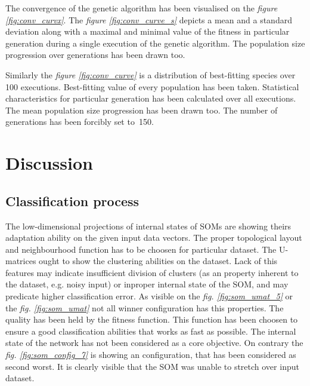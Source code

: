 \documentclass[a4paper]{IEEEtran}
\begin{document}
The convergence of the genetic algorithm has been visualised
on the \textit{figure \ref{fig:conv_curvx}}.
The \textit{figure \ref{fig:conv_curve_s}} depicts a mean and a standard deviation 
along with a maximal and minimal value of the fitness
in particular generation during a single execution of the genetic algorithm.
The population size progression over generations has been drawn too.

Similarly the \textit{figure \ref{fig:conv_curve}} is a distribution of best-fitting species over 100 executions.
Best-fitting value of every population has been taken. Statistical characteristics for particular generation
has been calculated over all executions.
The mean population size progression has been drawn too. The number of generations has been forcibly set to~150.


\section{Discussion}
\subsection{Classification process}
The low-dimensional projections of internal states of SOMs are showing theirs adaptation
ability on the given input data vectors. The proper topological layout and neighbourhood 
function \cite{somtoolbox} has to be choosen for particular dataset. 
The U-matrices ought to show 
the clustering abilities on the dataset. 
Lack of this features may indicate insufficient
division of clusters (as an property inherent to the dataset, e.g. noisy input)
or inproper internal state of the SOM,
and may predicate higher classification error. As visible on the \textit{fig. \ref{fig:som_umat_5}} or the \textit{fig. \ref{fig:som_umat}} not all winner 
configuration has this properties. The quality
has been held by the fitness function. This function has been choosen to ensure a
good classification abilities that works as fast as possible.
The internal state of the network has not been considered as a core objective.
On contrary the \textit{fig. \ref{fig:som_config_7}} is showing an configuration, 
that has been considered as second worst. 
It is clearly visible that the SOM was unable to stretch over input dataset.
\end{document}
